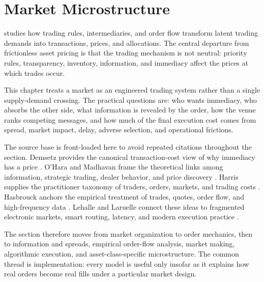 \section{Market Microstructure}

 studies how trading rules, intermediaries, and order flow transform latent trading demands into transactions, prices, and allocations. The central departure from frictionless asset pricing is that the trading mechanism is not neutral: priority rules, transparency, inventory, information, and immediacy affect the prices at which trades occur.

This chapter treats a market as an engineered trading system rather than a single supply-demand crossing. The practical questions are: who wants immediacy, who absorbs the other side, what information is revealed by the order, how the venue ranks competing messages, and how much of the final execution cost comes from spread, market impact, delay, adverse selection, and operational frictions.

The source base is front-loaded here to avoid repeated citations throughout the section. Demsetz provides the canonical transaction-cost view of why immediacy has a price \cite{demsetz_1968}. O'Hara and Madhavan frame the theoretical links among information, strategic trading, dealer behavior, and price discovery \cite{o_hara_1995,madhavan_2000}. Harris supplies the practitioner taxonomy of traders, orders, markets, and trading costs \cite{harris_2002}. Hasbrouck anchors the empirical treatment of trades, quotes, order flow, and high-frequency data \cite{hasbrouck_2007}. Lehalle and Laruelle connect these ideas to fragmented electronic markets, smart routing, latency, and modern execution practice \cite{lehalle_2018}.

The section therefore moves from market organization to order mechanics, then to information and spreads, empirical order-flow analysis, market making, algorithmic execution, and asset-class-specific microstructure. The common thread is implementation: every model is useful only insofar as it explains how real orders become real fills under a particular market design.



\newpage


\newpage


\newpage


\newpage


\newpage


\newpage

